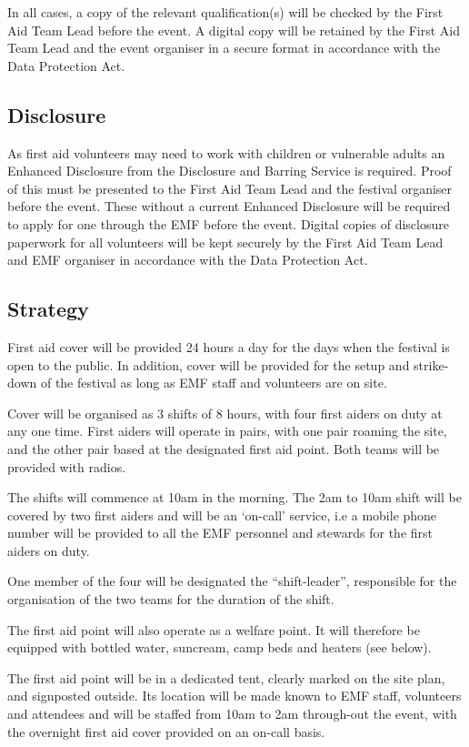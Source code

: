 In all cases, a copy of the relevant qualification(s) will be checked by the
First Aid Team Lead before the event. A digital copy will be retained by the
First Aid Team Lead and the event organiser in a secure format in accordance
with the Data Protection Act.

\subsection{Disclosure}
As first aid volunteers may need to work with children or vulnerable adults an
Enhanced Disclosure from the Disclosure and Barring Service is required. Proof
of this must be presented to the First Aid Team Lead and the festival organiser
before the event. These without a current Enhanced Disclosure will be required
to apply for one through the EMF  before the event. Digital copies of disclosure
paperwork for all volunteers will be kept securely by the First Aid Team Lead and
EMF organiser in accordance with the Data Protection Act.

\subsection{Strategy}
First aid cover will be provided 24 hours a day for the days when the festival
is open to the public. In addition, cover will be provided for the setup and
strike-down of the festival as long as EMF staff and volunteers are on site.

Cover will be organised as 3 shifts of 8 hours, with four first aiders on duty
at any one time. First aiders will operate in pairs, with one pair roaming the
site, and the other pair based at the designated first aid point. Both teams
will be provided with radios.

The shifts will commence at 10am in the morning. The 2am to 10am shift will
be covered by two first aiders and will be an `on-call’ service, i.e a mobile
phone number will be provided to all the EMF personnel and stewards for the
first aiders on duty.

One member of the four will be designated the ``shift-leader'', responsible for
the organisation of the two teams for the duration of the shift.

The first aid point will also operate as a welfare point. It will therefore be
equipped with bottled water, suncream, camp beds and heaters (see below).

The first aid point will be in a dedicated tent, clearly marked on the site
plan, and signposted outside. Its location will be made known to EMF staff,
volunteers and attendees and will be staffed from 10am to 2am through-out
the event, with the overnight first aid cover provided on an on-call basis.

